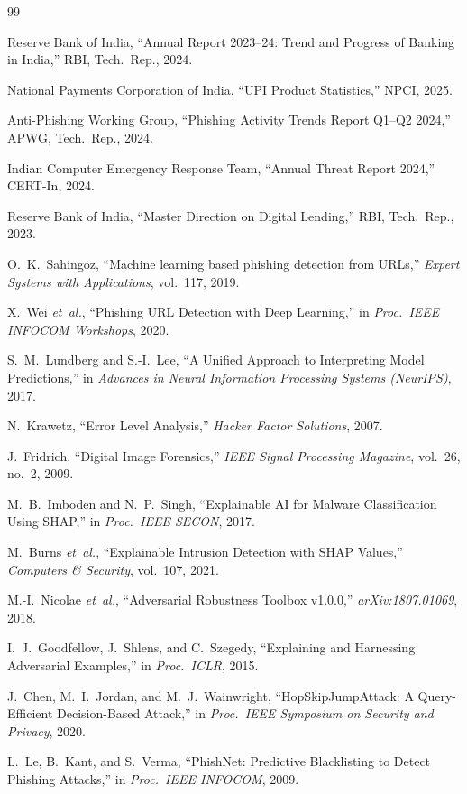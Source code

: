 \documentclass[conference]{IEEEtran}
\begin{document}
\begin{thebibliography}{99}

Reserve Bank of India, ``Annual Report 2023--24: Trend and Progress of
Banking in India,'' RBI, Tech.\ Rep., 2024.

National Payments Corporation of India, ``UPI Product Statistics,''
NPCI, 2025.

Anti-Phishing Working Group, ``Phishing Activity Trends Report
Q1--Q2 2024,'' APWG, Tech.\ Rep., 2024.

Indian Computer Emergency Response Team, ``Annual Threat Report
2024,'' CERT-In, 2024.

Reserve Bank of India, ``Master Direction on Digital Lending,'' RBI,
Tech.\ Rep., 2023.

O.\ K.\ Sahingoz, ``Machine learning based phishing detection from
URLs,'' \emph{Expert Systems with Applications}, vol.\ 117, 2019.

X.\ Wei \emph{et~al.}, ``Phishing URL Detection with Deep Learning,''
in \emph{Proc.\ IEEE INFOCOM Workshops}, 2020.

S.\ M.\ Lundberg and S.-I.\ Lee, ``A Unified Approach to Interpreting
Model Predictions,'' in \emph{Advances in Neural Information
Processing Systems (NeurIPS)}, 2017.

N.\ Krawetz, ``Error Level Analysis,'' \emph{Hacker Factor Solutions},
2007.

J.\ Fridrich, ``Digital Image Forensics,'' \emph{IEEE Signal
Processing Magazine}, vol.\ 26, no.\ 2, 2009.

M.\ B.\ Imboden and N.\ P.\ Singh, ``Explainable AI for Malware
Classification Using SHAP,'' in \emph{Proc.\ IEEE SECON}, 2017.

M.\ Burns \emph{et~al.}, ``Explainable Intrusion Detection with SHAP
Values,'' \emph{Computers \& Security}, vol.\ 107, 2021.

M.-I.\ Nicolae \emph{et~al.}, ``Adversarial Robustness Toolbox
v1.0.0,'' \emph{arXiv:1807.01069}, 2018.

I.\ J.\ Goodfellow, J.\ Shlens, and C.\ Szegedy, ``Explaining and
Harnessing Adversarial Examples,'' in \emph{Proc.\ ICLR}, 2015.

J.\ Chen, M.\ I.\ Jordan, and M.\ J.\ Wainwright, ``HopSkipJumpAttack:
A Query-Efficient Decision-Based Attack,'' in \emph{Proc.\ IEEE
Symposium on Security and Privacy}, 2020.

L.\ Le, B.\ Kant, and S.\ Verma, ``PhishNet: Predictive Blacklisting
to Detect Phishing Attacks,'' in \emph{Proc.\ IEEE INFOCOM}, 2009.

\end{thebibliography}
\end{document}
